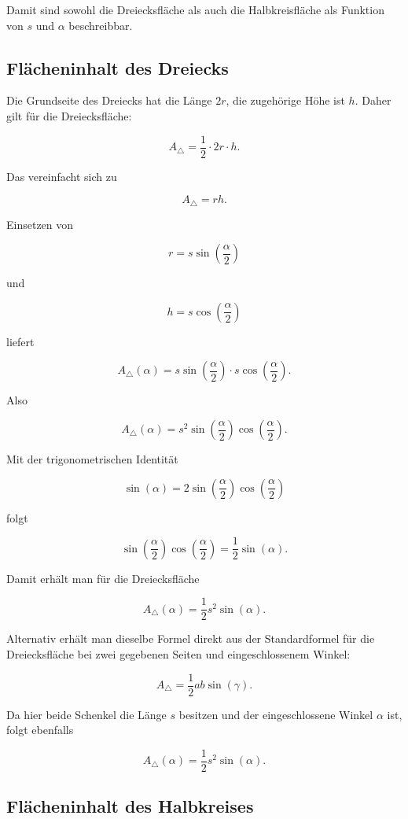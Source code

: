 Damit sind sowohl die Dreiecksfläche als auch die Halbkreisfläche als
Funktion von \(s\) und \(\alpha\) beschreibbar.

\subsection{Flächeninhalt des Dreiecks}

Die Grundseite des Dreiecks hat die Länge \(2r\), die zugehörige Höhe ist
\(h\). Daher gilt für die Dreiecksfläche:

\[
A_\triangle
=
\frac{1}{2}\cdot 2r \cdot h.
\]

Das vereinfacht sich zu

\[
A_\triangle
=
r h.
\]

Einsetzen von

\[
r=s\sin\left(\frac{\alpha}{2}\right)
\]

und

\[
h=s\cos\left(\frac{\alpha}{2}\right)
\]

liefert

\[
A_\triangle(\alpha)
=
s\sin\left(\frac{\alpha}{2}\right)
\cdot
s\cos\left(\frac{\alpha}{2}\right).
\]

Also

\[
A_\triangle(\alpha)
=
s^2
\sin\left(\frac{\alpha}{2}\right)
\cos\left(\frac{\alpha}{2}\right).
\]

Mit der trigonometrischen Identität

\[
\sin(\alpha)
=
2\sin\left(\frac{\alpha}{2}\right)
\cos\left(\frac{\alpha}{2}\right)
\]

folgt

\[
\sin\left(\frac{\alpha}{2}\right)
\cos\left(\frac{\alpha}{2}\right)
=
\frac{1}{2}\sin(\alpha).
\]

Damit erhält man für die Dreiecksfläche

\[
A_\triangle(\alpha)
=
\frac{1}{2}s^2\sin(\alpha).
\]

Alternativ erhält man dieselbe Formel direkt aus der Standardformel für
die Dreiecksfläche bei zwei gegebenen Seiten und eingeschlossenem Winkel:

\[
A_\triangle
=
\frac{1}{2}ab\sin(\gamma).
\]

Da hier beide Schenkel die Länge \(s\) besitzen und der eingeschlossene
Winkel \(\alpha\) ist, folgt ebenfalls

\[
A_\triangle(\alpha)
=
\frac{1}{2}s^2\sin(\alpha).
\]

\subsection{Flächeninhalt des Halbkreises}

